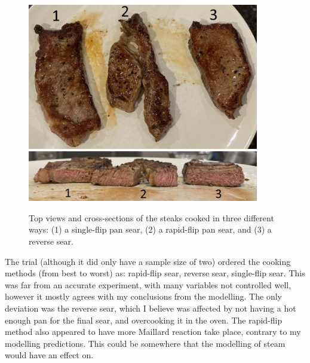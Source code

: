 \documentclass[11pt]{article}
\begin{document}
	\begin{figure}[H]
		\centering
		\includegraphics[width=0.9\textwidth]{./img/steak-top.jpeg}
		\includegraphics[width=0.9\textwidth]{./img/steak-side.jpeg}
		\caption{Top views and cross-sections of the steaks cooked in three different ways: (1) a single-flip pan sear, (2) a rapid-flip pan sear, and (3) a reverse sear.}
		\label{fig:steak}
	\end{figure}
	
	The trial (although it did only have a sample size of two) ordered the cooking methods (from best to worst) as: rapid-flip sear, reverse sear, single-flip sear. This was far from an accurate experiment, with many variables not controlled well, however it mostly agrees with my conclusions from the modelling. The only deviation was the reverse sear, which I believe was affected by not having a hot enough pan for the final sear, and overcooking it in the oven. The rapid-flip method also appeared to have more Maillard reaction take place, contrary to my modelling predictions. This could be somewhere that the modelling of steam would have an effect on.
\end{document}
